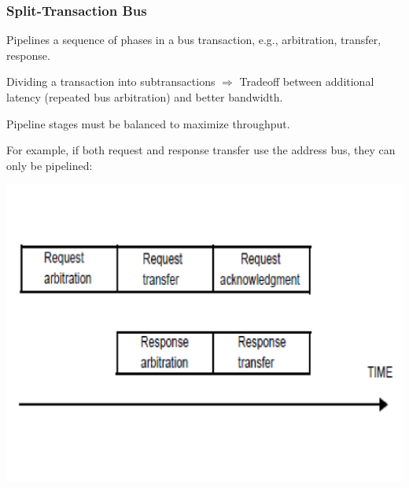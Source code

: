 \documentclass{beamer}
\begin{document}
\begin{frame}[fragile,t]
\frametitle{Split-Transaction Bus}

Pipelines a sequence of phases in a bus transaction,
e.g., arbitration, transfer, response.\bigskip

Dividing a transaction into subtransactions $\Rightarrow$
Tradeoff between \pause additional latency (repeated bus arbitration) and better bandwidth.\bigskip

Pipeline stages must be balanced to maximize throughput.\bigskip

For example, if both request and response transfer use the address bus,
they can only be pipelined:
\vspace{-4ex}

\includegraphics[width=44ex]{Figures/FigsInfCoherence/SplitTransBus}

\end{frame}
\end{document}
